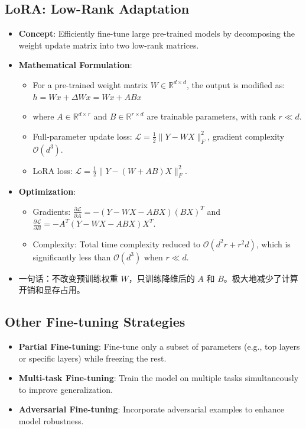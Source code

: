 \documentclass[UTF8]{ctexart}
\begin{document}
\subsection{LoRA: Low-Rank Adaptation}
\begin{itemize}
    \item \textbf{Concept}: Efficiently fine-tune large pre-trained models by decomposing the weight update matrix into two low-rank matrices.
    \item \textbf{Mathematical Formulation}:
    \begin{itemize}
        \item For a pre-trained weight matrix $W \in \mathbb{R}^{d \times d}$, the output is modified as: $h = Wx + \Delta Wx = Wx + ABx$
        \item where $A \in \mathbb{R}^{d \times r}$ and $B \in \mathbb{R}^{r \times d}$ are trainable parameters, with rank $r \ll d$.
        \item Full-parameter update loss: $\mathcal{L} = \frac{1}{2} \| Y - WX \|_F^2$, gradient complexity $\mathcal{O}(d^3)$.
        \item LoRA loss: $\mathcal{L} = \frac{1}{2} \| Y - (W + AB)X \|_F^2$.
    \end{itemize}
    \item \textbf{Optimization}:
    \begin{itemize}
        \item Gradients: $\frac{\partial \mathcal{L}}{\partial A} = -(Y - WX - ABX)(BX)^T$ and $\frac{\partial \mathcal{L}}{\partial B} = -A^T (Y - WX - ABX)X^T$.
        \item Complexity: Total time complexity reduced to $\mathcal{O}(d^2 r + r^2 d)$, which is significantly less than $\mathcal{O}(d^3)$ when $r \ll d$.
    \end{itemize}
    \item 一句话：不改变预训练权重 $W$，只训练降维后的 $A$ 和 $B$。极大地减少了计算开销和显存占用。
\end{itemize}

\subsection{Other Fine-tuning Strategies}
\begin{itemize}
    \item \textbf{Partial Fine-tuning}: Fine-tune only a subset of parameters (e.g., top layers or specific layers) while freezing the rest.
    \item \textbf{Multi-task Fine-tuning}: Train the model on multiple tasks simultaneously to improve generalization.
    \item \textbf{Adversarial Fine-tuning}: Incorporate adversarial examples to enhance model robustness.
\end{itemize}
\end{document}
